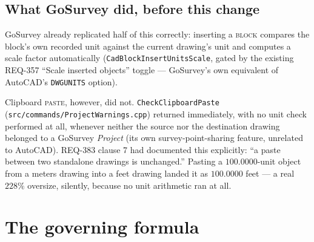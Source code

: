 \documentclass[11pt]{article}
\begin{document}
\subsection*{What GoSurvey did, before this change}

GoSurvey already replicated half of this correctly: inserting a
\textsc{block} compares the block's own recorded unit against the current
drawing's unit and computes a scale factor automatically
(\texttt{CadBlockInsertUnitsScale}, gated by the existing REQ-357
``Scale inserted objects'' toggle --- GoSurvey's own equivalent of
AutoCAD's \texttt{DWGUNITS} option).

Clipboard \textsc{paste}, however, did not. \texttt{CheckClipboardPaste}
(\texttt{src/commands/ProjectWarnings.cpp}) returned immediately, with no
unit check performed at all, whenever neither the source nor the
destination drawing belonged to a GoSurvey \emph{Project} (its own
survey-point-sharing feature, unrelated to AutoCAD). REQ-383 clause 7 had
documented this explicitly: ``a paste between two standalone drawings is
unchanged.'' Pasting a $100.0000$-unit object from a meters drawing into a
feet drawing landed it as $100.0000$ feet --- a real $228\%$ oversize,
silently, because no unit arithmetic ran at all.

\section{The governing formula}
\label{sec:formula}
\end{document}
